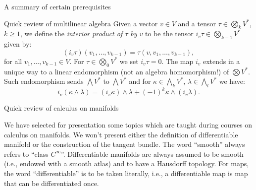 \documentclass[oneside,a4paper,11pt]{amsbook}
\theoremstyle{remark}\newtheorem{exercise}{Exercise}[chapter]
\theoremstyle{plain}\newtheorem{teo}{Theorem}[section]
\theoremstyle{plain}\newtheorem{lem}[teo]{Lemma}
\theoremstyle{plain}\newtheorem{prop}[teo]{Proposition}
\theoremstyle{plain}\newtheorem{cor}[teo]{Corollary}
\theoremstyle{definition}\newtheorem{defin}[teo]{Definition}
\theoremstyle{remark}\newtheorem{rem}[teo]{Remark}
\theoremstyle{definition}\newtheorem{notation}[teo]{Notation}
\theoremstyle{definition}\newtheorem{convention}[teo]{Convention}
\theoremstyle{definition}\newtheorem{example}[teo]{Example}
\numberwithin{section}{chapter}
\numberwithin{equation}{section}
\begin{document}
\begin{chapter}{A summary of certain prerequisites}
\begin{section}{Quick review of multilinear algebra}
Given a vector $v\in V$ and a tensor $\tau\in\bigotimes_kV^*$, $k\ge1$, we define the {\em interior product of $\tau$ by $v$\/} to be the
tensor $i_v\tau\in\bigotimes_{k-1}V^*$ given by:
\[(i_v\tau)(v_1,\ldots,v_{k-1})=\tau(v,v_1,\ldots,v_{k-1}),\]
for all $v_1,\ldots,v_{k-1}\in V$. For $\tau\in\bigotimes_0V^*$ we set $i_v\tau=0$. The map $i_v$ extends in a unique way to a linear endomorphism
(not an algebra homomorphism!) of $\bigotimes V^*$. Such endomorphism sends $\bigwedge V^*$ to $\bigwedge V^*$ and for $\kappa\in\bigwedge_kV^*$,
$\lambda\in\bigwedge_lV^*$ we have:
\begin{equation}\label{eq:propiv}
i_v(\kappa\wedge\lambda)=(i_v\kappa)\wedge\lambda+(-1)^k\kappa\wedge(i_v\lambda).
\end{equation}

\end{section}

\begin{section}{Quick review of calculus on manifolds}\label{sec:quickmanifold}

We have selected for presentation some topics which are taught during courses on calculus on manifolds. We won't present either the definition of differentiable manifold
or the construction of the tangent bundle. The word ``smooth'' always refers to ``class $C^\infty$''. Differentiable manifolds are always
assumed to be smooth (i.e., endowed with a smooth atlas) and to have a Hausdorff topology. For maps, the word ``differentiable'' is to be taken literally,
i.e., a differentiable map is map that can be differentiated once.


\end{section}
\end{chapter}
\end{document}
